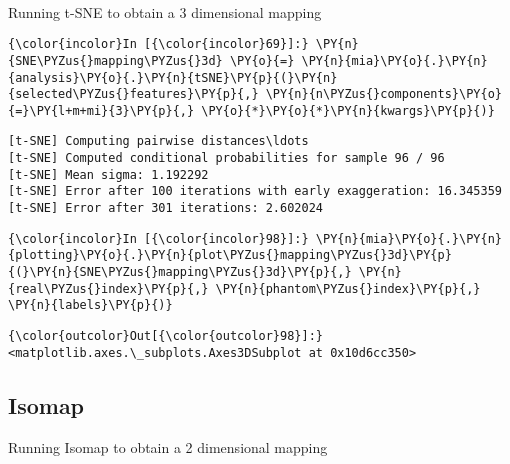     \begin{center}
    \end{center}
    { \hspace*{\fill} \\}

    Running t-SNE to obtain a 3 dimensional mapping

    \begin{Verbatim}[commandchars=\\\{\}]
{\color{incolor}In [{\color{incolor}69}]:} \PY{n}{SNE\PYZus{}mapping\PYZus{}3d} \PY{o}{=} \PY{n}{mia}\PY{o}{.}\PY{n}{analysis}\PY{o}{.}\PY{n}{tSNE}\PY{p}{(}\PY{n}{selected\PYZus{}features}\PY{p}{,} \PY{n}{n\PYZus{}components}\PY{o}{=}\PY{l+m+mi}{3}\PY{p}{,} \PY{o}{*}\PY{o}{*}\PY{n}{kwargs}\PY{p}{)}
\end{Verbatim}

    \begin{Verbatim}[commandchars=\\\{\}]
[t-SNE] Computing pairwise distances\ldots
[t-SNE] Computed conditional probabilities for sample 96 / 96
[t-SNE] Mean sigma: 1.192292
[t-SNE] Error after 100 iterations with early exaggeration: 16.345359
[t-SNE] Error after 301 iterations: 2.602024
    \end{Verbatim}

    \begin{Verbatim}[commandchars=\\\{\}]
{\color{incolor}In [{\color{incolor}98}]:} \PY{n}{mia}\PY{o}{.}\PY{n}{plotting}\PY{o}{.}\PY{n}{plot\PYZus{}mapping\PYZus{}3d}\PY{p}{(}\PY{n}{SNE\PYZus{}mapping\PYZus{}3d}\PY{p}{,} \PY{n}{real\PYZus{}index}\PY{p}{,} \PY{n}{phantom\PYZus{}index}\PY{p}{,} \PY{n}{labels}\PY{p}{)}
\end{Verbatim}

            \begin{Verbatim}[commandchars=\\\{\}]
{\color{outcolor}Out[{\color{outcolor}98}]:} <matplotlib.axes.\_subplots.Axes3DSubplot at 0x10d6cc350>
\end{Verbatim}

    \subsection{Isomap}\label{isomap}

Running Isomap to obtain a 2 dimensional mapping

